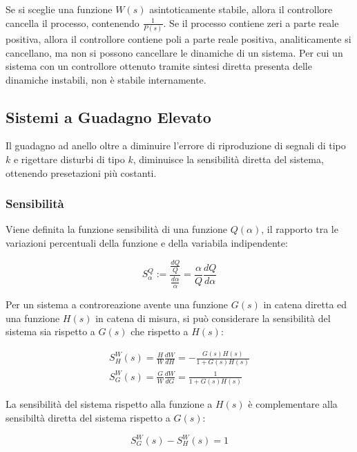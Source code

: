 \documentclass{article}
\numberwithin{equation}{subsection}
\begin{document}
Se si sceglie una funzione $W(s)$ asintoticamente stabile, allora il controllore cancella il processo, contenendo $\displaystyle\frac{1}{P(s)}$. Se il processo contiene zeri 
a parte reale positiva, allora il controllore contiene poli a parte reale positiva, analiticamente si cancellano, ma non si possono cancellare le dinamiche di un sistema.  
Per cui un sistema con un controllore ottenuto tramite sintesi diretta presenta delle dinamiche instabili, non è stabile internamente. 

\subsection{Sistemi a Guadagno Elevato}

Il guadagno ad anello oltre a diminuire l'errore di riproduzione di segnali di tipo $k$ e rigettare disturbi di tipo $k$, diminuisce la sensibilità diretta del 
sistema, ottenendo presetazioni più costanti. 



\subsubsection{Sensibilità}

Viene definita la funzione sensibilità di una funzione $Q(\alpha)$, il rapporto tra le variazioni percentuali della funzione e della variabila indipendente:

\begin{equation}
    S_{\alpha}^Q:=\displaystyle\frac{\displaystyle\frac{dQ}{Q}}{\displaystyle\frac{d\alpha}{\alpha}}=\frac{\alpha}{Q}\frac{dQ}{d\alpha}
\end{equation}

Per un sistema a controreazione avente una funzione $G(s)$ in catena diretta ed una funzione $H(s)$ in catena di misura, si può considerare la sensibilità del sistema 
sia rispetto a $G(s)$ che rispetto a $H(s)$:

\begin{gather}
    S_H^W(s)=\displaystyle\frac{H}{W}\frac{dW}{dH}=-\frac{G(s)H(s)}{1+G(s)H(s)}\\
    S_G^W(s)=\displaystyle\frac{G}{W}\frac{dW}{dG}=\frac{1}{1+G(s)H(s)}
\end{gather}

La sensibilità del sistema rispetto alla funzione a $H(s)$ è complementare alla sensibiltà diretta del sistema rispetto a $G(s)$:

\begin{equation}
    S^W_G(s)-S^W_H(s)=1
\end{equation}
\end{document}
